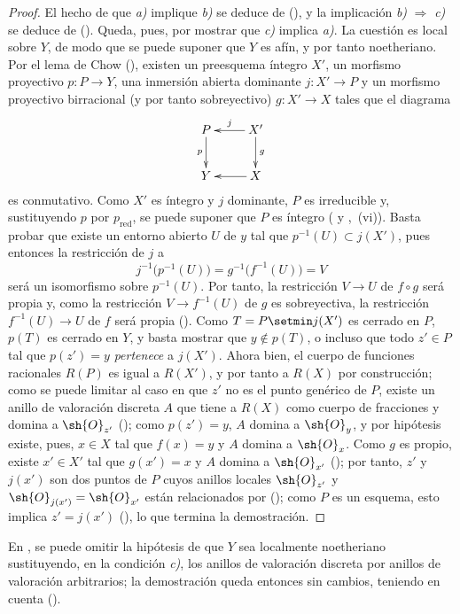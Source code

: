 \begin{proof}
El hecho de que \emph{a)} implique \emph{b)} se deduce de (), y la implicación \emph{b)} $\Rightarrow$ \emph{c)} se deduce de ().
Queda, pues, por mostrar que \emph{c)} implica \emph{a)}.
La cuestión es local sobre $Y$, de modo que se puede suponer que $Y$ es afín, y por tanto noetheriano. Por el lema de Chow (), existen un preesquema íntegro $X'$, un morfismo proyectivo $p:P\to Y$, una inmersión abierta dominante $j:X'\to P$ y un morfismo proyectivo birracional (y por tanto sobreyectivo) $g:X'\to X$ tales que el diagrama
\[
  \xymatrix{
    P \ar[d]_-{p} & X' \ar[l]_-{j} \ar[d]^-{g} \\
    Y & X \ar[l]
  }
\]
es conmutativo.
Como $X'$ es íntegro y $j$ dominante, $P$ es irreducible y, sustituyendo $p$ por $p_\mathrm{red}$, se puede suponer que $P$ es íntegro ( y ,~(vi)).
Basta probar que existe un entorno abierto $U$ de $y$ tal que $p^{-1}(U)\subset j(X')$, pues entonces la restricción de $j$ a
\[
  j^{-1}\bigl(p^{-1}(U)\bigr)=g^{-1}\bigl(f^{-1}(U)\bigr)=V
\]
será un isomorfismo sobre $p^{-1}(U)$. Por tanto, la restricción $V\to U$ de $f\circ g$ será propia y, como la restricción $V\to f^{-1}(U)$ de $g$ es sobreyectiva, la restricción $f^{-1}(U)\to U$ de $f$ será propia ().
Como $T=P\setmin j(X')$ es cerrado en $P$, $p(T)$ es cerrado en $Y$, y basta mostrar que $y\notin p(T)$, o incluso que todo $z'\in P$ tal que $p(z')=y$ \emph{pertenece} a $j(X')$.
Ahora bien, el cuerpo de funciones racionales $R(P)$ es igual a $R(X')$, y por tanto a $R(X)$ por construcción; como se puede limitar al caso en que $z'$ no es el punto genérico de $P$, existe un anillo de valoración discreta $A$ que tiene a $R(X)$ como cuerpo de fracciones y domina a $\sh{O}_{z'}$ (); como $p(z')=y$, $A$ domina a $\sh{O}_y$, y por hipótesis existe, pues, $x\in X$ tal que $f(x)=y$ y $A$ domina a $\sh{O}_x$.
Como $g$ es propio, existe $x'\in X'$ tal que $g(x')=x$ y $A$ domina a $\sh{O}_{x'}$ (); por tanto, $z'$ y $j(x')$ son dos puntos de $P$ cuyos anillos locales $\sh{O}_{z'}$ y $\sh{O}_{j(x')}=\sh{O}_{x'}$ están relacionados por (); como $P$ es un esquema, esto implica $z'=j(x')$ (), lo que termina la demostración.
\end{proof}

\begin{remark}[15.7.3]
\label{IV.15.7.3}
En , se puede omitir la hipótesis de que $Y$ sea localmente noetheriano sustituyendo, en la condición \emph{c)}, los anillos de valoración discreta por anillos de valoración arbitrarios; la demostración queda entonces sin cambios, teniendo en cuenta ().
\end{remark}

